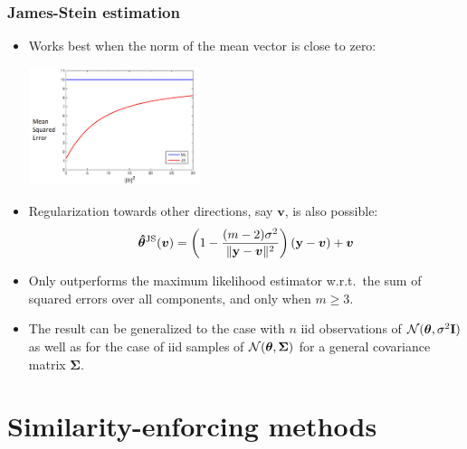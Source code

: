 \documentclass[11pt,compress,t,notes=noshow, xcolor=table]{beamer}
\begin{document}
\begin{frame}
	\frametitle{James-Stein estimation}
	
	\footnotesize
	\begin{itemize}
		
		\item Works best when the norm of the mean vector is close to zero:\\
		\begin{center}
			\includegraphics[width=5cm]{figure/JS}
		\end{center}  
		\item Regularization towards other directions, say $\bm{v}$, is also possible:
		$$
		\bm{\hat\theta}^{\mathrm{JS}}(\bm{v}) = \left (1 - \frac{(m-2)\sigma^2}{\|\mathbf{y} - \bm{v}\|^2} \right )(\mathbf{y} - \bm{v}) + \bm{v}
		$$
		\item Only outperforms the maximum likelihood estimator w.r.t.\ the sum of squared errors over all components, and only when $m \geq 3.$
		\item The result can be generalized to the case with $n$ iid observations of $\mathcal{N}(\bm{\theta}, \sigma^2\mathbf{I})$ as well as for the case of iid samples of $\mathcal{N}(\bm{\theta}, \bm{\Sigma})$ for a general covariance matrix $\bm{\Sigma}.$
	\end{itemize}
\end{frame}

\section{Similarity-enforcing methods}
\end{document}
